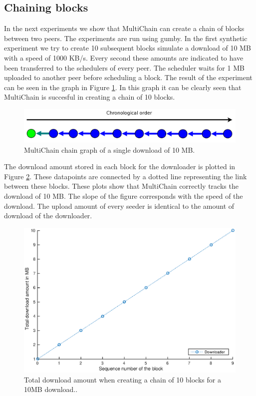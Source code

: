 \subsection{Chaining blocks}
\label{subsect-chain-exp}
In the next experiments we show that MultiChain can create a chain of blocks between two peers.
The experiments are run using gumby.
In the first synthetic experiment we try to create 10 subsequent blocks simulate a download of 10 MB with a speed of 1000 KB/s.
Every second these amounts are indicated to have been transferred to the schedulers of every peer.
The scheduler waits for 1 MB uploaded to another peer before scheduling a block.
The result of the experiment can be seen in the graph in Figure \ref{fig:chain-experiment-graph}.
In this graph it can be clearly seen that MultiChain is succesful in creating a chain of 10 blocks.

\begin{figure}[!h]
	\centerline{\includegraphics[scale=0.20]{experimentation/chain/chain.png}}
	\caption{MultiChain chain graph of a single download of 10 MB.}
	\label{fig:chain-experiment-graph}
\end{figure}

The download amount stored in each block for the downloader is plotted in Figure \ref{fig:chain-experiment-amounts-small}.
These datapoints are connected by a dotted line representing the link between these blocks.
These plots show that MultiChain correctly tracks the download of 10 MB.
The slope of the figure corresponds with the speed of the download.
The upload amount of every seeder is identical to the amount of download of the downloader.

\begin{figure}
\centerline{\includegraphics[scale=0.5]{experimentation/chain/small/chain-down.eps}}
\caption{Total download amount when creating a chain of 10 blocks for a 10MB download..}
\label{fig:chain-experiment-amounts-small}
\end{figure}

